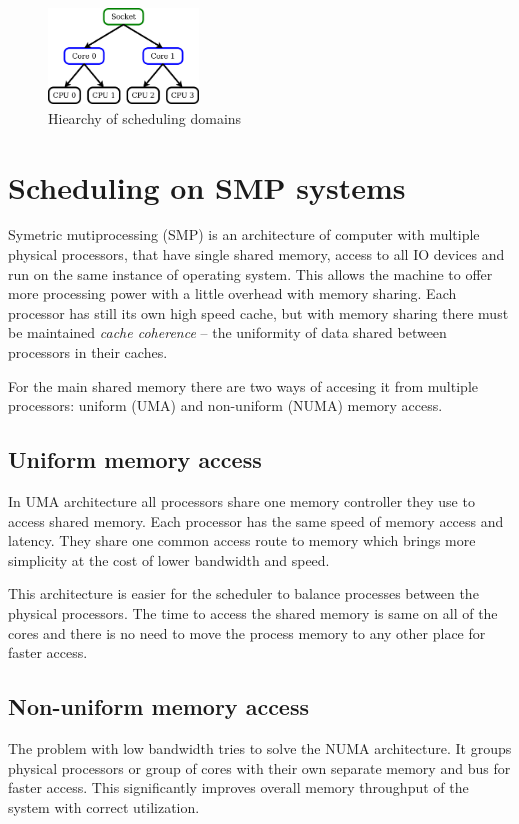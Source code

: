 \begin{figure}
  \centering
  \includegraphics[width=4cm]{obrazky-figures/sched-domains}
  \caption{Hiearchy of scheduling domains}
  \label{fig:sched-dom}
\end{figure}

\section{Scheduling on SMP systems}
Symetric mutiprocessing (SMP) is an architecture of computer with multiple
physical processors, that have single shared memory, access to all IO devices
and run on the same instance of operating system. This allows the machine to
offer more processing power with a little overhead with memory sharing. Each
processor has still its own high speed cache, but with memory sharing there must
be maintained \emph{cache coherence} -- the uniformity of data shared between
processors in their caches.

For the main shared memory there are two ways of accesing it from multiple
processors: uniform (UMA) and non-uniform (NUMA) memory access.

\subsection{Uniform memory access}
In UMA architecture all processors share one memory controller they use to
access shared memory. Each processor has the same speed of memory access and
latency. They share one common access route to memory which brings more
simplicity at the cost of lower bandwidth and speed.

This architecture is easier for the scheduler to balance processes between
the physical processors. The time to access the shared memory is same on all of
the cores and there is no need to move the process memory to any other place for
faster access.

\subsection{Non-uniform memory access}
The problem with low bandwidth tries to solve the NUMA architecture.
It groups physical processors or group of cores with their own separate memory
and bus for faster access. This significantly improves overall memory throughput
of the system with correct utilization.

